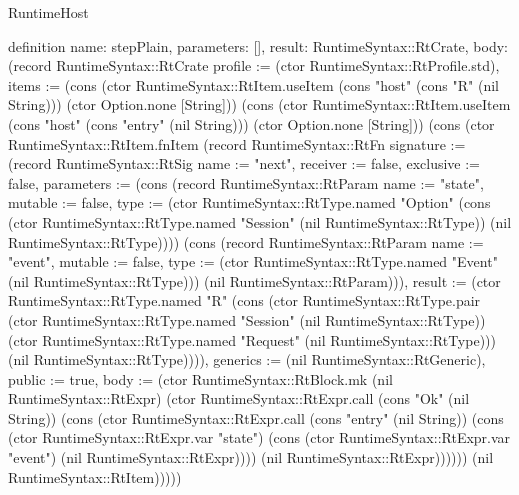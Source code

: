 \begin{lexlean}{RuntimeHost}
\begin{semanticmodule}
definition{
  name: stepPlain,
  parameters: [],
  result: RuntimeSyntax::RtCrate,
  body: (record RuntimeSyntax::RtCrate {profile := (ctor RuntimeSyntax::RtProfile.std), items := (cons (ctor RuntimeSyntax::RtItem.useItem (cons "host" (cons "R" (nil String))) (ctor Option.none [String])) (cons (ctor RuntimeSyntax::RtItem.useItem (cons "host" (cons "entry" (nil String))) (ctor Option.none [String])) (cons (ctor RuntimeSyntax::RtItem.fnItem (record RuntimeSyntax::RtFn {signature := (record RuntimeSyntax::RtSig {name := "next", receiver := false, exclusive := false, parameters := (cons (record RuntimeSyntax::RtParam {name := "state", mutable := false, type := (ctor RuntimeSyntax::RtType.named "Option" (cons (ctor RuntimeSyntax::RtType.named "Session" (nil RuntimeSyntax::RtType)) (nil RuntimeSyntax::RtType)))}) (cons (record RuntimeSyntax::RtParam {name := "event", mutable := false, type := (ctor RuntimeSyntax::RtType.named "Event" (nil RuntimeSyntax::RtType))}) (nil RuntimeSyntax::RtParam))), result := (ctor RuntimeSyntax::RtType.named "R" (cons (ctor RuntimeSyntax::RtType.pair (ctor RuntimeSyntax::RtType.named "Session" (nil RuntimeSyntax::RtType)) (ctor RuntimeSyntax::RtType.named "Request" (nil RuntimeSyntax::RtType))) (nil RuntimeSyntax::RtType)))}), generics := (nil RuntimeSyntax::RtGeneric), public := true, body := (ctor RuntimeSyntax::RtBlock.mk (nil RuntimeSyntax::RtExpr) (ctor RuntimeSyntax::RtExpr.call (cons "Ok" (nil String)) (cons (ctor RuntimeSyntax::RtExpr.call (cons "entry" (nil String)) (cons (ctor RuntimeSyntax::RtExpr.var "state") (cons (ctor RuntimeSyntax::RtExpr.var "event") (nil RuntimeSyntax::RtExpr)))) (nil RuntimeSyntax::RtExpr))))})) (nil RuntimeSyntax::RtItem))))})
}


\end{semanticmodule}
\end{lexlean}
